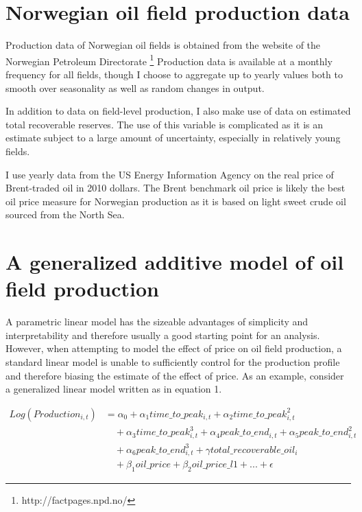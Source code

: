 \documentclass[12pt]{scrartcl} %
\begin{document}
\section{Norwegian oil field production data}
Production data of Norwegian oil fields is obtained from the website of the Norwegian Petroleum Directorate \footnote{http://factpages.npd.no/}  Production data is available at a monthly frequency for all fields, though I choose to aggregate up to yearly values both to smooth over seasonality as well as random changes in output.  

In addition to data on field-level production, I also make use of data on estimated total recoverable reserves.  The use of this variable is complicated as it is an estimate subject to a large amount of uncertainty, especially in relatively young fields.  

I use yearly data from the US Energy Information Agency on the real price of Brent-traded oil in 2010 dollars.  The Brent benchmark oil price is likely the best oil price measure for Norwegian production as it is based on light sweet crude oil sourced from the North Sea.   

\section{A generalized additive model of oil field production}
A parametric linear model has the sizeable advantages of simplicity and interpretability and therefore usually a good starting point for an analysis.  However, when attempting to model the effect of price on oil field production, a standard linear model is unable to sufficiently control for the production profile and therefore biasing the estimate of the effect of price.  As an example, consider a generalized linear model written as in equation 1. 

	\begin{equation}
	\begin{split}
	 Log(Production_{i,t}) & = \alpha_0 + \alpha_1 time\_to\_peak_{i,t} + \alpha_2 time\_to\_peak_{i,t}^2 \\
	& \quad + \alpha_3 time\_to\_peak_{i,t}^3  + \alpha_4 peak\_to\_end_{i,t} + \alpha_5 peak\_to\_end_{i,t}^2 \\
	& \quad + \alpha_6 peak\_to\_end_{i,t}^3 + \gamma total\_recoverable\_oil_i \\
	& \quad + \beta_1 oil\_price + \beta_2 oil\_price\_l1 + ...+ \epsilon
	\end{split}
	\end{equation}
\end{document}
